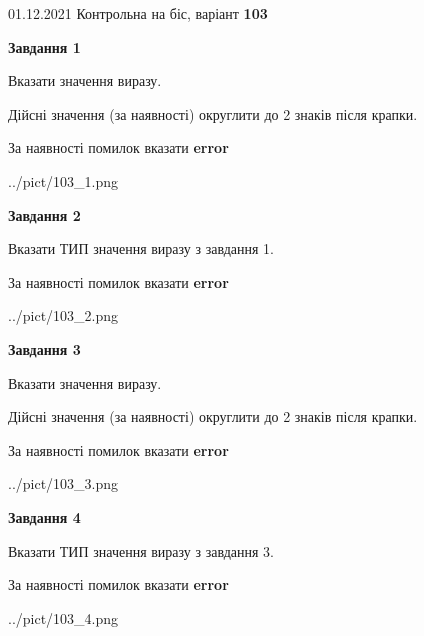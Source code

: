 \documentclass[11pt, ukrainian]{article}
\begin{document}
{01.12.2021 Контрольна на біс, варіант  \No \textbf { 103 }\par}
{
\begin {large}
{\begin {center}\textbf{Завдання 1}\end {center}}\par
Вказати значення виразу. \par
Дійсні значення (за наявності) округлити до 2 знаків після крапки. \par
За наявності помилок вказати \textbf{error}

\begin{center}
	{../pict/103_1.png}
\end{center}
\newpage

{\begin {center}\textbf{Завдання 2}\end {center}}\par
Вказати ТИП значення виразу з завдання 1. \par
За наявності помилок вказати \textbf{error}

\begin{center}
	{../pict/103_2.png}
\end{center}
\newpage

{\begin {center}\textbf{Завдання 3}\end {center}}\par
Вказати значення виразу. \par
Дійсні значення (за наявності) округлити до 2 знаків після крапки. \par
За наявності помилок вказати \textbf{error}

\begin{center}
	{../pict/103_3.png}
\end{center}
\newpage

{\begin {center}\textbf{Завдання 4}\end {center}}\par
Вказати ТИП значення виразу з завдання 3. \par
За наявності помилок вказати \textbf{error}

\begin{center}
	{../pict/103_4.png}
\end{center}
\newpage


\end{large}}
\end{document}
